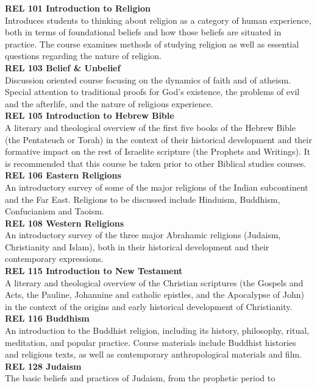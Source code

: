\documentclass[
  letterpaper,
]{scrbook}
\begin{document}
\textbf{REL 101 Introduction to Religion}\\
Introduces students to thinking about religion as a category of human
experience, both in terms of foundational beliefs and how those beliefs
are situated in practice. The course examines methods of studying
religion as well as essential questions regarding the nature of
religion.\\
\textbf{REL 103 Belief \& Unbelief}\\
Discussion oriented course focusing on the dynamics of faith and of
atheism. Special attention to traditional proofs for God's existence,
the problems of evil and the afterlife, and the nature of religious
experience.\\
\textbf{REL 105 Introduction to Hebrew Bible}\\
A literary and theological overview of the first five books of the
Hebrew Bible (the Pentateuch or Torah) in the context of their
historical development and their formative impact on the rest of
Israelite scripture (the Prophets and Writings). It is recommended that
this course be taken prior to other Biblical studies courses.\\
\textbf{REL 106 Eastern Religions}\\
An introductory survey of some of the major religions of the Indian
subcontinent and the Far East. Religions to be discussed include
Hinduism, Buddhism, Confucianism and Taoism.\\
\textbf{REL 108 Western Religions}\\
An introductory survey of the three major Abrahamic religions (Judaism,
Christianity and Islam), both in their historical development and their
contemporary expressions.\\
\textbf{REL 115 Introduction to New Testament}\\
A literary and theological overview of the Christian scriptures (the
Gospels and Acts, the Pauline, Johannine and catholic epistles, and the
Apocalypse of John) in the context of the origins and early historical
development of Christianity.\\
\textbf{REL 116 Buddhism}\\
An introduction to the Buddhist religion, including its history,
philosophy, ritual, meditation, and popular practice. Course materials
include Buddhist histories and religious texts, as well as contemporary
anthropological materials and film.\\
\textbf{REL 128 Judaism}\\
The basic beliefs and practices of Judaism, from the prophetic period to
\end{document}
